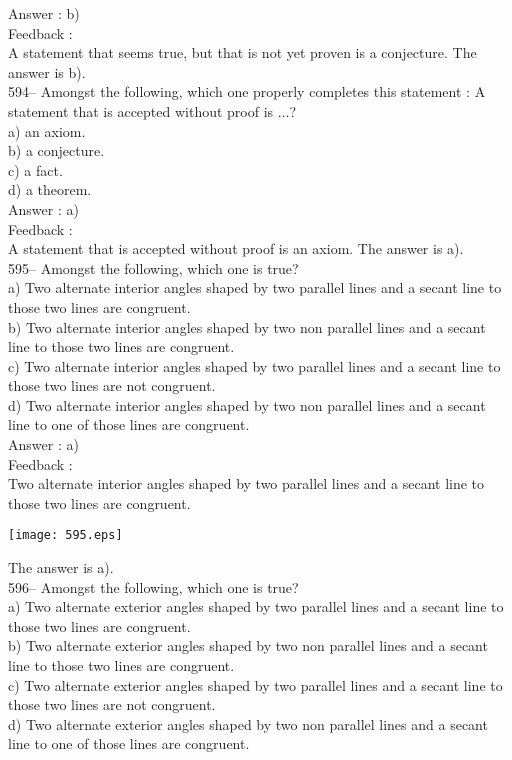 \documentclass[letterpaper, 12pt]{article}
\begin{document}
Answer : b)\\

Feedback : \\
A statement that seems true, but that is not yet proven is a conjecture.  The answer is b).\\

594-- Amongst the following, which one properly completes this statement : \og A statement that is accepted without proof is  $\ldots$\fg ?\\
a) an axiom.\\
b) a conjecture.\\
c) a fact.\\
d) a theorem.\\

Answer : a)\\

Feedback : \\
A statement that is accepted without proof is an axiom.  The answer is a).  \\

595-- Amongst the following, which one is true?\\
a) Two alternate interior angles shaped by two parallel lines and a secant line to those two lines are congruent.\\
b) Two alternate interior angles shaped by two non parallel lines and a secant line to those two lines are congruent.\\
c) Two alternate interior angles shaped by two parallel lines and a secant line to those two lines are not congruent.\\
d) Two alternate interior angles shaped by two non parallel lines and a secant line to one of those lines are congruent.\\

Answer : a)\\

Feedback : \\
Two alternate interior angles shaped by two parallel lines and a secant line to those two lines are congruent.
   \begin{center}
    \texttt{[image: 595.eps]}
    \end{center}  The answer is a).\\

596-- Amongst the following, which one is true?\\
a) Two alternate exterior angles shaped by two parallel lines and a secant line to those two lines are congruent.\\
b) Two alternate exterior angles shaped by two non parallel lines and a secant line to those two lines are congruent.\\
c) Two alternate exterior angles shaped by two parallel lines and a secant line to those two lines are not congruent.\\
d) Two alternate exterior angles shaped by two non parallel lines and a secant line to one of those lines are congruent.\\
\end{document}
